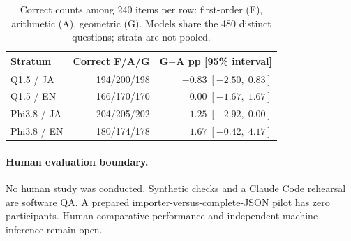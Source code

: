 \documentclass[11pt]{article}
\begin{document}
\begin{table}[h]
\centering\small
\setlength{\tabcolsep}{3pt}
\begin{tabular}{@{}lrr@{}}
\toprule
Stratum & Correct F/A/G & G$-$A pp [95\% interval] \\
\midrule
Q1.5 / JA & 194/200/198 & $-0.83\;[-2.50,\;0.83]$ \\
Q1.5 / EN & 166/170/170 & $0.00\;[-1.67,\;1.67]$ \\
Phi3.8 / JA & 204/205/202 & $-1.25\;[-2.92,\;0.00]$ \\
Phi3.8 / EN & 180/174/178 & $1.67\;[-0.42,\;4.17]$ \\
\bottomrule
\end{tabular}
\caption{Correct counts among 240 items per row: first-order (F), arithmetic (A), geometric (G). Models share the 480 distinct questions; strata are not pooled.}
\label{tab:aggregation}
\end{table}

\paragraph{Human evaluation boundary.}
No human study was conducted. Synthetic checks and a Claude Code rehearsal are software QA. A prepared importer-versus-complete-JSON pilot has zero participants. Human comparative performance and independent-machine inference remain open.
\end{document}
